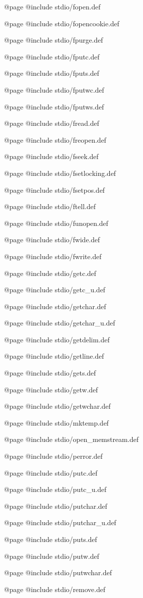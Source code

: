 @page
@include stdio/fopen.def

@page
@include stdio/fopencookie.def

@page
@include stdio/fpurge.def

@page
@include stdio/fputc.def

@page
@include stdio/fputs.def

@page
@include stdio/fputwc.def

@page
@include stdio/fputws.def

@page
@include stdio/fread.def

@page
@include stdio/freopen.def

@page
@include stdio/fseek.def

@page
@include stdio/fsetlocking.def

@page
@include stdio/fsetpos.def

@page
@include stdio/ftell.def

@page
@include stdio/funopen.def

@page
@include stdio/fwide.def

@page
@include stdio/fwrite.def

@page
@include stdio/getc.def

@page
@include stdio/getc_u.def

@page
@include stdio/getchar.def

@page
@include stdio/getchar_u.def

@page
@include stdio/getdelim.def

@page
@include stdio/getline.def

@page
@include stdio/gets.def

@page
@include stdio/getw.def

@page
@include stdio/getwchar.def

@page
@include stdio/mktemp.def

@page
@include stdio/open_memstream.def

@page
@include stdio/perror.def

@page
@include stdio/putc.def

@page
@include stdio/putc_u.def

@page
@include stdio/putchar.def

@page
@include stdio/putchar_u.def

@page
@include stdio/puts.def

@page
@include stdio/putw.def

@page
@include stdio/putwchar.def

@page
@include stdio/remove.def

